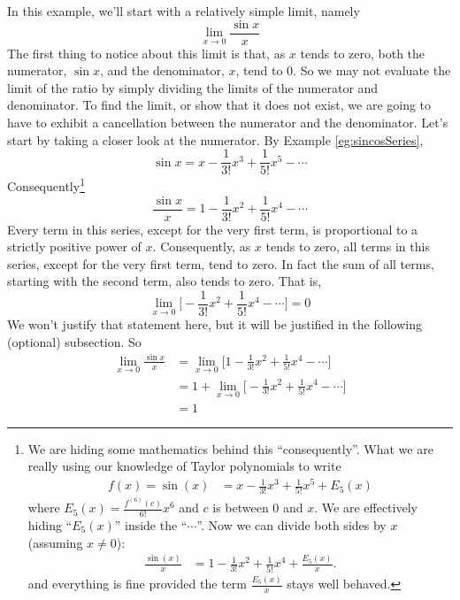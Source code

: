 \begin{eg}\label{eg:TaylorlimitA}
In this example, we'll start with a relatively simple limit, namely
\begin{equation*}
\lim_{x\rightarrow 0}\frac{\sin x}{x}
\end{equation*}
The first thing to notice about this limit is that, as $x$ tends to zero,
both the numerator, $\sin x$, and the denominator, $x$, tend to $0$.
So we may not evaluate the limit of the ratio by simply dividing
the limits of the numerator and denominator.
To find the limit, or show that it does not exist,
we are going to have to exhibit a cancellation between the numerator and
the denominator. Let's start by taking a closer look at
the numerator. By Example \ref{eg:sincosSeries},
\begin{equation*}
\sin x = x-\frac{1}{3!}x^3+\frac{1}{5!}x^5 - \cdots
\end{equation*}
Consequently\footnote{We are hiding some mathematics behind this ``consequently''. What we are really using
our knowledge of Taylor polynomials to write
\begin{align*}
  f(x) = \sin(x) &= x-\frac{1}{3!}x^3+\frac{1}{5!}x^5 + E_5(x)
\end{align*}
where $E_5(x) = \frac{f^{(6)}(c)}{6!} x^6$ and $c$ is between 0 and $x$. We are effectively hiding ``$E_5(x)$'' inside
the ``$\cdots$''. Now we can divide both sides by $x$ (assuming $x \neq 0$):
\begin{align*}
\frac{\sin(x)}{x} &= 1-\frac{1}{3!}x^2+\frac{1}{5!}x^4 + \frac{E_5(x)}{x}.
\end{align*}
and everything is fine provided the term $\frac{E_5(x)}{x}$ stays well behaved.
}
\begin{equation*}
\frac{\sin x}{x}=1-\frac{1}{3!}x^2 + \frac{1}{5!}x^4 - \cdots
\end{equation*}
Every term in this series, except for the very first term, is
proportional to a strictly positive power of $x$.
Consequently, as $x$ tends to zero, all terms in this series, except for the
very first term, tend to zero. In fact the sum of all terms,
starting with the second term, also tends to zero. That is,
\begin{equation*}
\lim_{x\rightarrow 0}\Big[-\frac{1}{3!}x^2 + \frac{1}{5!}x^4 - \cdots\Big]
=0
\end{equation*}
We won't justify that statement here, but it will be justified
in the following (optional) subsection. So
\begin{align*}
\lim_{x\rightarrow 0}\frac{\sin x}{x}
& =\lim_{x\rightarrow 0}\Big[1-\frac{1}{3!}x^2 + \frac{1}{5!}x^4 - \cdots\Big]
\\
&=1+\lim_{x\rightarrow 0}\Big[-\frac{1}{3!}x^2 + \frac{1}{5!}x^4 - \cdots\Big]
\\
&=1
\end{align*}
\end{eg}


